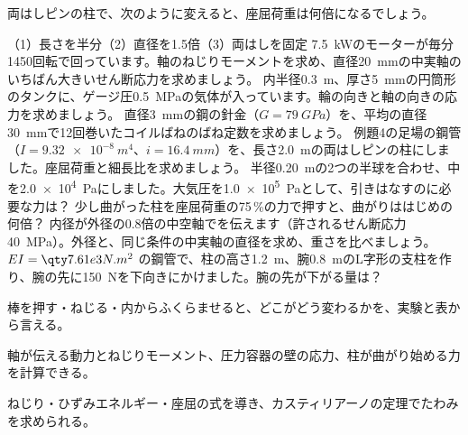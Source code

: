 \bkendproblems
{}
\bkproblem 両はしピンの柱で、次のように変えると、座屈荷重は何倍になるでしょう。\par
（1）\nobreak 長さを半分\quad（2）\nobreak 直径を1.5倍\quad（3）\nobreak 両はしを固定
\bkproblem \qty{7.5}{kW}のモーターが毎分1450回転で回っています。軸のねじりモーメントを求め、直径\qty{20}{mm}の中実軸のいちばん大きいせん断応力を求めましょう。
\bkproblem 内半径\qty{0.3}{m}、厚さ\qty{5}{mm}の円筒形のタンクに、ゲージ圧\qty{0.5}{MPa}の気体が入っています。輪の向きと軸の向きの応力を求めましょう。
\bkproblem 直径\qty{3}{mm}の鋼の針金（$G=\qty{79}{GPa}$）を、平均の直径\qty{30}{mm}で12回巻いたコイルばねのばね定数を求めましょう。
\bkproblem 例題4の足場の鋼管（$I=\qty{9.32e-8}{m^4}$、$i=\qty{16.4}{mm}$）を、長さ\qty{2.0}{m}の両はしピンの柱にしました。座屈荷重と細長比を求めましょう。
\bkproblem 半径\qty{0.20}{m}の2つの半球を合わせ、中を\qty{2.0e4}{Pa}にしました。大気圧を\qty{1.0e5}{Pa}として、引きはなすのに必要な力は？
\bkproblem 少し曲がった柱を座屈荷重の75\,\%の力で押すと、曲がりははじめの何倍？
\bkproblem 内径が外径の0.8倍の中空軸でを伝えます（許されるせん断応力\qty{40}{MPa}）。外径と、同じ条件の中実軸の直径を求め、重さを比べましょう。
\bkproblem $EI=\pxlq{7.61e3}{N.m^2}$ の鋼管で、柱の高さ\qty{1.2}{m}、腕\qty{0.8}{m}のL字形の支柱を作り、腕の先に\qty{150}{N}を下向きにかけました。腕の先が下がる量は？

\begin{furikaeri}
\begin{checklist}
\item 棒を押す・ねじる・内からふくらませると、どこがどう変わるかを、実験と表から言える。
\item 軸が伝える動力とねじりモーメント、圧力容器の壁の応力、柱が曲がり始める力を計算できる。
\item ねじり・ひずみエネルギー・座屈の式を導き、カスティリアーノの定理でたわみを求められる。
\end{checklist}
\end{furikaeri}
